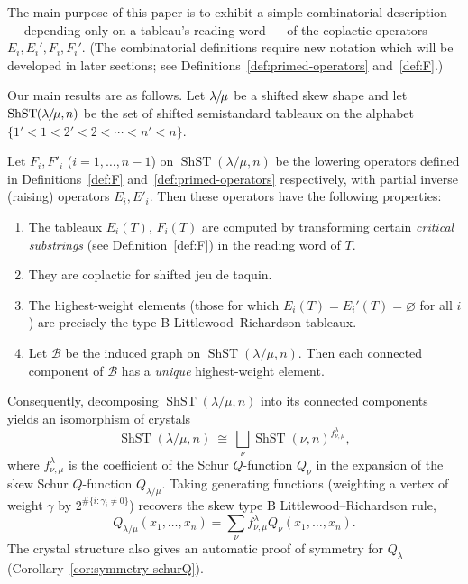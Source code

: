 \documentclass[ALCO,ThmDefs,Unicode,epreuves]{cedram}
\DeclareMathOperator{\ShST}{ShST}
\newcommand{\B}{\mathcal{B}}
\newcommand*{\mk}{\mkern -1mu}
\newcommand*{\Mk}{\mkern -2mu}
\begin{document}
The main purpose of this paper is to exhibit a simple combinatorial description --- depending only on a tableau's reading word --- of the coplactic operators $E_i,E_i',F_i,F_i'$. (The combinatorial definitions require new notation which will be developed in later sections; see Definitions~\ref{def:primed-operators} and~\ref{def:F}.)

Our main results are as follows. Let $\lambda\mk/\Mk\mu$ be a shifted skew shape and let~$\ShST\mk(\lambda\mk/\mk\mk\mu,\mk n)$ be the set of shifted semistandard tableaux on the alphabet $\{1' < 1 < 2' < 2 < \cdots < n' < n\}.$

\begin{theorem}\label{thm:main}
Let $F_i,F'_i$ \textup{(}$i = 1, \ldots, n-1$\textup{)} on $\ShST(\lambda/\mu,n)$ be the lowering operators defined in Definitions~\ref{def:F} and~\ref{def:primed-operators} respectively, with partial inverse \textup{(}raising\textup{)} operators $E_i, E'_i$. Then these operators have the following properties:

\begin{enumerate}[label={(\roman*)}]
\item %
The tableaux $E_i(T)$, $F_i(T)$ are computed by transforming certain \emph{critical substrings} \textup{(}see Definition~\ref{def:F}\textup{)} in the reading word of $T$.
 \item %
 They are coplactic for shifted jeu de taquin.
\item %
The highest-weight elements \textup{(}those for which $E_i(T) = E_i'(T) = \varnothing$ for all $i$\textup{)} are precisely the type B Littlewood--Richardson tableaux.
\item %
Let $\B$ be the induced graph on $\ShST(\lambda/\mu,n)$. Then each connected component of $\B$ has a \emph{unique} highest-weight element.
\end{enumerate}
\end{theorem}
Consequently, decomposing $\ShST(\lambda/\mu,n)$ into its connected components yields an isomorphism of crystals
\[
\ShST(\lambda/\mu,n)\ \cong\ \bigsqcup_\nu \ShST(\nu,n)^{f_{\nu,\mu}^\lambda},
\]
where $f_{\nu,\mu}^\lambda$ is the coefficient of the Schur $Q$-function $Q_\nu$ in the expansion of the skew Schur $Q$-function $Q_{\lambda/\mu}$. Taking generating functions (weighting a vertex of weight $\gamma$ by $2^{\#\{i:\gamma_i\neq 0\}}$) recovers the skew type B Littlewood--Richardson rule,
\[
Q_{\lambda/\mu}(x_1, \ldots, x_n) = \sum_\nu f_{\nu,\mu}^\lambda Q_\nu(x_1, \ldots, x_n).
\]
The crystal structure also gives an automatic proof of symmetry for $Q_\lambda$ (Corollary~\ref{cor:symmetry-schurQ}).
\end{document}
